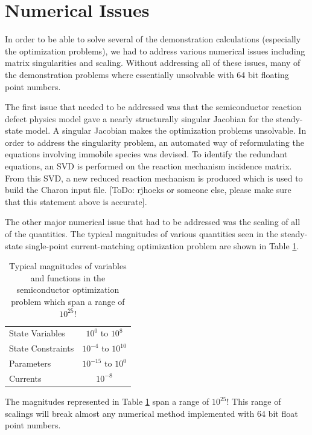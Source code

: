 \documentclass[pdf,ps2pdf,11pt]{SANDreport}
\begin{document}
{%
\section{Numerical Issues}
%

In order to be able to solve several of the demonstration calculations
(especially the optimization problems), we had to address various numerical
issues including matrix singularities and scaling.  Without addressing all of
these issues, many of the demonstration problems where essentially unsolvable
with 64 bit floating point numbers.

The first issue that needed to be addressed was that the semiconductor
reaction defect physics model gave a nearly structurally singular Jacobian for
the steady-state model.  A singular Jacobian makes the optimization problems
unsolvable.  In order to address the singularity problem, an automated way of
reformulating the equations involving immobile species was devised.  To
identify the redundant equations, an SVD is performed on the reaction mechanism
incidence matrix.  From this SVD, a new reduced reaction mechanism is produced
which is used to build the Charon input file. [ToDo: rjhoeks or someone else,
please make sure that this statement above is accurate].

The other major numerical issue that had to be addressed was the scaling of
all of the quantities.  The typical magnitudes of various quantities seen in
the steady-state single-point current-matching optimization problem are shown
in Table {}\ref{table:SemiconductorMagnitudes}.
%
{\bsinglespace
\begin{table}
\caption[Typical magnitudes of quantities in
semiconductor optimization problem]{
\label{table:SemiconductorMagnitudes}
Typical magnitudes of variables and functions in the semiconductor
optimization problem which span a range of $10^{25}$!}
\begin{center}
\begin{tabular}{|l|c|}
\hline
State Variables &  $10^{0}$ to $10^{8}$ \\
State Constraints & $10^{-4}$ to $10^{10}$ \\
Parameters & $10^{-15}$ to $10^{0}$ \\
Currents & $10^{-8}$ \\
\hline
\end{tabular}
\end{center}
\end{table}
\esinglespace}
%
%
%
%
%
%
%
The magnitudes represented in Table {}\ref{table:SemiconductorMagnitudes} span
a range of $10^{25}$!  This range of scalings will break almost any numerical
method implemented with 64 bit float point numbers.

}
\end{document}
